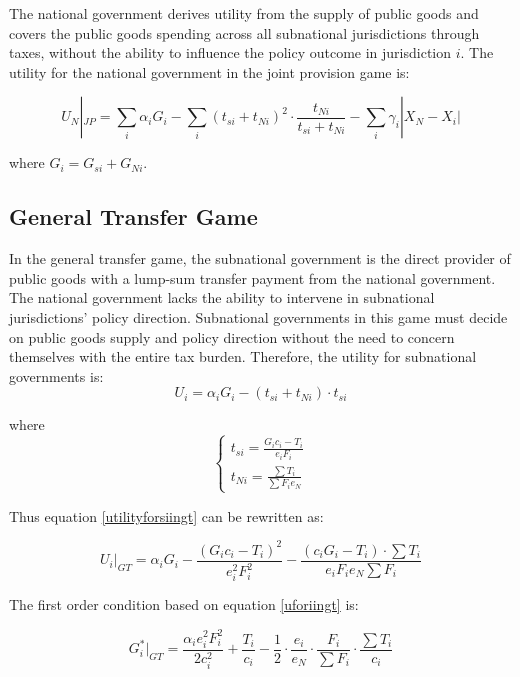 \documentclass[man]{apa7}
\begin{document}
The national government derives utility from the supply of public goods and covers the public goods spending across all subnational jurisdictions through taxes, without the ability to influence the policy outcome in jurisdiction $i$. The utility for the national government in the joint provision game is:%

\begin{equation}
  U_N|_{JP}= \sum_i \alpha_i G_i - \sum_i (t_{si}+t_{Ni})^2 \cdot \frac{t_{Ni}}{t_{si}+t_{Ni}}
  -\sum_i \gamma_i |X_N-X_i|
\end{equation}

where $G_i=G_{si}+G_{Ni}$.

\subsection{General Transfer Game}

In the general transfer game, the subnational government is the direct provider of public goods with a lump-sum transfer payment from the national government. The national government lacks the ability to intervene in subnational jurisdictions' policy direction. Subnational governments in this game must decide on public goods supply and policy direction without the need to concern themselves with the entire tax burden. Therefore, the utility for subnational governments is:
\begin{equation}
  U_i=\alpha_i G_i -(t_{si}+t_{Ni})\cdot t_{si}\label{utilityforsiingt}
\end{equation}

where
$$
  \left\{\begin{array}{l}
    t_{si}= \frac{G_i c_i-T_i}{e_i F_i} \\
    t_{Ni}=\frac{\sum T_i}{\sum F_i e_N}
  \end{array}\right.
$$

Thus equation \ref{utilityforsiingt} can be rewritten as:

\begin{equation}
  U_i|_{GT}=\alpha_i G_i- \frac{(G_i c_i-T_i)^2}{e_i^2 F_i^2}-\frac{(c_iG_i-T_i)\cdot \sum T_i}{e_i F_i e_N\sum F_i } \label{uforiingt}
\end{equation}

The first order condition based on equation \ref{uforiingt} is:

\begin{equation}
  G_i^*|_{GT}=\frac{\alpha_i e_i^2F_i^2}{2c_i^2}+\frac{T_i}{c_i}-\frac{1}{2}\cdot \frac{e_i}{e_N}\cdot \frac{F_i}{\sum F_i} \cdot \frac{\sum T_i}{c_i}\label{gofgeneral}
\end{equation}
\end{document}
